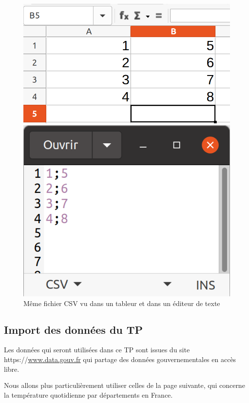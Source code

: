 \begin{figure}[ht!]
\begin{minipage}{0.45\linewidth}
\begin{center}
 \includegraphics[width=0.7\linewidth]{img/calc}
\end{center}
\end{minipage}\hfill
\begin{minipage}{0.45\linewidth}
\begin{center}
 \includegraphics[width=0.6\linewidth]{img/gedit}
\end{center}
\end{minipage}
\caption{Même fichier CSV vu dans un tableur et dans un éditeur de texte}
\end{figure}

\subsection{Import des données du TP}

Les données qui seront utilisées dans ce TP sont issues du site https://\url{www.data.gouv.fr} qui partage des données gouvernementales en accès libre.

Nous allons plus particulièrement utiliser celles de la page suivante, qui concerne la température quotidienne par départements en France.

